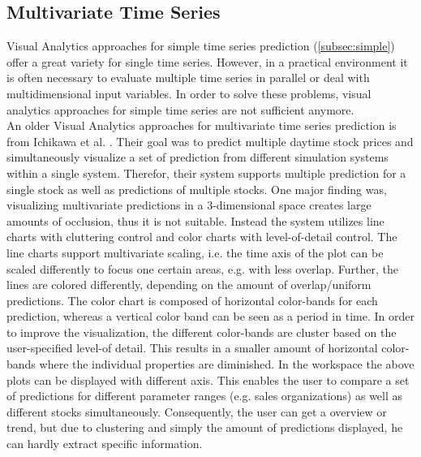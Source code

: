 \documentclass[electronic]{vgtc}             %
\begin{document}
\subsection{Multivariate Time Series \label{subsec:multivar}}
Visual Analytics approaches for simple time series prediction (\autoref{subsec:simple}) offer a great variety for single time series.
However, in a practical environment it is often necessary to evaluate multiple time series in parallel or deal with multidimensional input variables.
In order to solve these problems, visual analytics approaches for simple time series are not sufficient anymore.\\ 
An older Visual Analytics approaches for multivariate time series prediction is from Ichikawa et al. \cite{ichikawa:2002}.
Their goal was to predict multiple daytime stock prices and simultaneously visualize a set of prediction from different simulation systems within a single system. 
Therefor, their system supports multiple prediction for a single stock as well as predictions of multiple stocks. 
One major finding was, visualizing multivariate predictions in a 3-dimensional space creates large amounts of occlusion, thus it is not suitable.
Instead the system utilizes line charts with cluttering control and color charts with level-of-detail control. 
The line charts support multivariate scaling, i.e. the time axis of the plot can be scaled differently to focus one certain areas, e.g. with less overlap.
Further, the lines are colored differently, depending on the amount of overlap/uniform predictions.
The color chart is composed of horizontal color-bands for each prediction, whereas a vertical color band can be seen as a period in time. 
In order to improve the visualization, the different color-bands are cluster based on the user-specified level-of detail. 
This results in a smaller amount of horizontal color-bands where the individual properties are diminished. 
In the workspace the above plots can be displayed with different axis.
This enables the user to compare a set of predictions for different parameter ranges (e.g. sales organizations) as well as different stocks simultaneously.
Consequently, the user can get a overview or trend, but due to clustering and simply the amount of predictions displayed, he can hardly extract specific information.\\
\end{document}
